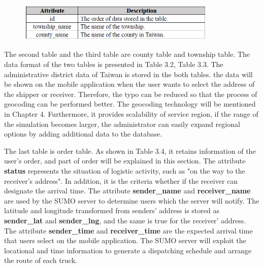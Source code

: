 \documentclass[12pt]{ksthesis}
\begin{document}
\begin{thesis}
{\begin{figure}[H]
\centering
{}
\includegraphics[width=0.85\textwidth]{./figures/Table3-3-TownshipTable.PNG}
\vspace{0.5cm}
\label{Fig:TownshipTable}
\end{figure}

The second table and the third table are county table and township table. The data format of the two tables is presented in Table 3.2, Table 3.3. The administrative district data of Taiwan is stored in the both tables. the data will be shown on the mobile application when the user wants to select the address of the shipper or receiver. Therefore, the typo can be reduced so that the process of geocoding can be performed better. 
The geocoding technology will be mentioned in Chapter 4. Furthermore, it provides scalability of service region, if the range of the simulation becomes larger, the administrator can easily expand regional options by adding additional data to the database. 

The last table is order table. As shown in Table 3.4, it retains information of the user’s order, and part of order will be explained in this section. The attribute \textbf{status} represents the situation of logistic activity, such as "on the way to the receiver’s address". 
In addition, it is the criteria whether if the receiver can designate the arrival time. The attribute \textbf{sender\_name} and \textbf{receiver\_name} are used by the SUMO server to determine users which the server will notify. The latitude and longitude transformed from senders’ address is stored as \textbf{sender\_lat} and \textbf{sender\_lng}, and the same is true for the receiver’ address. The attribute \textbf{sender\_time} and \textbf{receiver\_time} are the expected arrival time that users select on the mobile application. The SUMO server will exploit the locational and time information to generate a dispatching schedule and arrange the route of each truck. 

}
\end{thesis}
\end{document}
